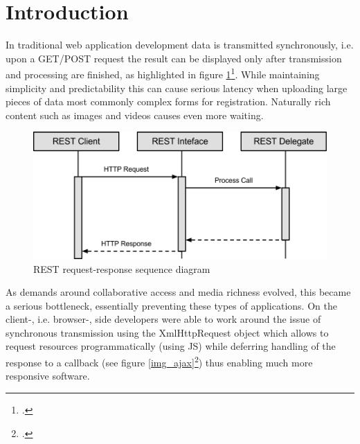 \listoffigures
{}
\newpage

\lstlistoflistings
{}
\newpage

\renewcommand{\thepage}{\arabic{page}}

\setcounter{page}{1} 

\renewcommand{\baselinestretch}{1.4}\normalsize

\section{Introduction}

In traditional web application development data is transmitted synchronously,
i.e. upon a GET/POST request the result can be displayed only after transmission
and processing are finished, as highlighted in figure
\ref{img_req_res}\footcite{req_res}. While maintaining simplicity and
predictability this can cause serious latency when uploading large pieces of
data most commonly complex forms for registration. Naturally rich content such
as images and videos causes even more waiting.

\begin{figure}[hbtp]
\centering
\includegraphics[scale=0.75]{img/rest_call.png}
\caption{REST request-response sequence diagram\label{img_req_res}}
\end{figure}

As demands around collaborative access and media richness evolved, this became a
serious bottleneck, essentially preventing these types of applications. On the
client-, i.e. browser-, side developers were able to work around the issue of
synchronous transmission using the XmlHttpRequest object which allows to request
resources programmatically (using JS) while
deferring handling of the response to a callback (see figure
\ref{img_ajax}\footcite{img_ajax}) thus enabling much more responsive software.


